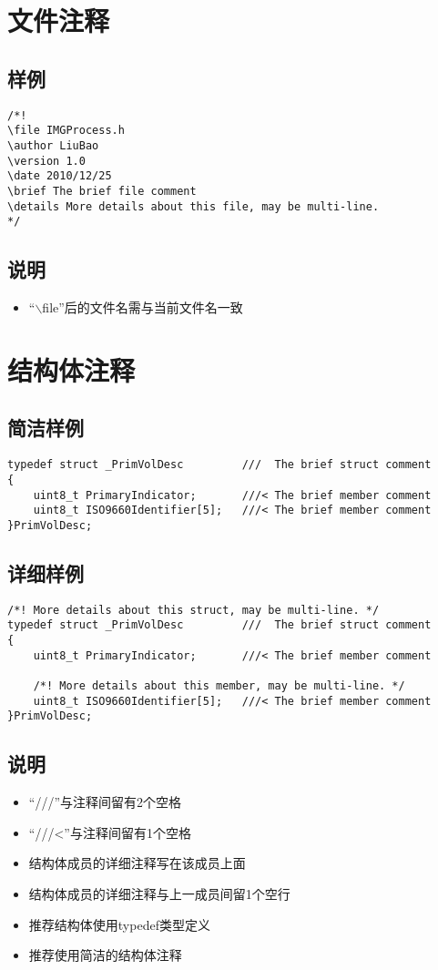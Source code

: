 \documentclass[11pt,a4paper]{article}
\begin{document}
\section{文件注释}
\subsection{样例}
\begin{lstlisting}[language={[ANSI]C}]
/*!
\file IMGProcess.h
\author LiuBao
\version 1.0
\date 2010/12/25
\brief The brief file comment
\details More details about this file, may be multi-line.
*/
\end{lstlisting}
\subsection{说明}
\begin{itemize}
\item “{$\backslash$file}”后的文件名需与当前文件名一致
\end{itemize}
\section{结构体注释}
\subsection{简洁样例}
\begin{lstlisting}[language={[ANSI]C}, morekeywords={uint8_t}]
typedef struct _PrimVolDesc			///  The brief struct comment
{
	uint8_t PrimaryIndicator;		///< The brief member comment
	uint8_t ISO9660Identifier[5];	///< The brief member comment
}PrimVolDesc;
\end{lstlisting}
\subsection{详细样例}
\begin{lstlisting}[language={[ANSI]C}, morekeywords={uint8_t}]
/*! More details about this struct, may be multi-line. */
typedef struct _PrimVolDesc			///  The brief struct comment
{
	uint8_t PrimaryIndicator;		///< The brief member comment
	
	/*! More details about this member, may be multi-line. */
	uint8_t ISO9660Identifier[5];	///< The brief member comment
}PrimVolDesc;
\end{lstlisting}
\subsection{说明}
\begin{itemize}
\item “{///}”与注释间留有2个空格
\item “{///<}”与注释间留有1个空格
\item 结构体成员的详细注释写在该成员上面
\item 结构体成员的详细注释与上一成员间留1个空行
\item 推荐结构体使用typedef类型定义
\item 推荐使用简洁的结构体注释
\end{itemize}
\end{document}

